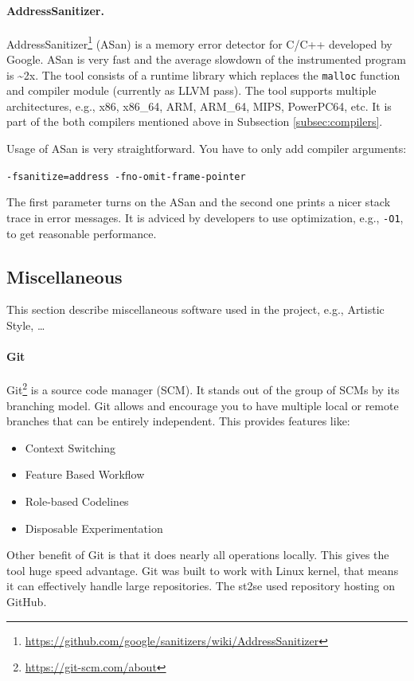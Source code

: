 \paragraph{AddressSanitizer.}
AddressSanitizer\footnote{\url{https://github.com/google/sanitizers/wiki/AddressSanitizer}} (ASan) is a memory error detector for C/C++ developed by Google.
ASan is very fast and the average slowdown of the instrumented program is \textasciitilde 2x.
The tool consists of a runtime library which replaces the \texttt{malloc} function and compiler module (currently as LLVM pass).
The tool supports multiple architectures, e.g., x86, x86\_64, ARM, ARM\_64, MIPS, PowerPC64, etc.
It is part of the both compilers mentioned above in Subsection \ref{subsec:compilers}.

Usage of ASan is very straightforward. You have to only add compiler arguments:\\
\begin{center}
	\texttt{-fsanitize=address -fno-omit-frame-pointer}
\end{center}
The first parameter turns on the ASan and the second one prints a nicer stack trace in error messages.
It is adviced by developers to use optimization, e.g., \texttt{-O1}, to get reasonable performance.

\subsection{Miscellaneous}
This section describe miscellaneous software used in the project, e.g., Artistic Style, \ldots
\paragraph{Git}
Git\footnote{\url{https://git-scm.com/about}} is a source code manager (SCM). It stands out of the group of SCMs by its branching model.
Git allows and encourage you to have multiple local or remote branches that can be entirely independent.
This provides features like:
\begin{itemize}
	\item Context Switching
	\item Feature Based Workflow
	\item Role-based Codelines
	\item Disposable Experimentation
\end{itemize}
Other benefit of Git is that it does nearly all operations locally.
This gives the tool huge speed advantage.
Git was built to work with Linux kernel, that means it can effectively handle large repositories.
The st2se used repository hosting on GitHub.

